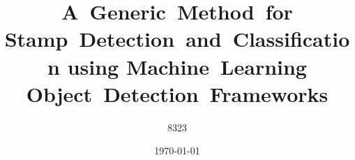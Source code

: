 \documentclass[12pt,oneside,a4paper]{hepthesis}
\title{A~Generic~Method~for Stamp~Detection~and~Classification using Machine~Learning Object~Detection~Frameworks}
\author{8323}
\date{\today}
\begin{document}



\begin{frontmatter}  %
  
\end{frontmatter}

\begin{mainmatter}

\end{mainmatter}

\begin{appendices} %

\end{appendices}

\begin{backmatter} %

\end{backmatter}
\end{document}

